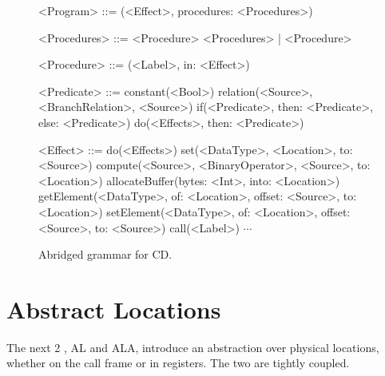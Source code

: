 \documentclass[main.tex]{subfiles}
\begin{document}
\begin{figure}[ht]
	\begin{grammar}
		
		<Program> ::= (<Effect>, procedures: <Procedures>)
		
		<Procedures> ::= <Procedure> <Procedures> | <Procedure>
		
		<Procedure> ::= (<Label>, in: <Effect>)
		
		<Predicate> ::= constant(<Bool>)
			\alt relation(<Source>, <BranchRelation>, <Source>)
			\alt if(<Predicate>, then: <Predicate>, else: <Predicate>)
			\alt do(<Effects>, then: <Predicate>)
		
		<Effect> ::= do(<Effects>)
			\alt set(<DataType>, <Location>, to: <Source>)
			\alt compute(<Source>, <BinaryOperator>, <Source>, to: <Location>)
			\alt allocateBuffer(bytes: <Int>, into: <Location>)
			\alt getElement(<DataType>, of: <Location>, offset: <Source>, to: <Location>)
			\alt setElement(<DataType>, of: <Location>, offset: <Source>, to: <Source>)
			\alt call(<Label>)
			\alt $\cdots$
		
	\end{grammar}
	\caption{Abridged grammar for CD.}
	\label{bnf:cd}
\end{figure}

\section{Abstract Locations}
The next 2 \ils{}, AL and ALA, introduce an abstraction over physical locations, whether on the call frame or in registers. The two \ils{} are tightly coupled.


\biblio{}
\onlyinsubfile{\glsaddall\printglossaries}
\end{document}
